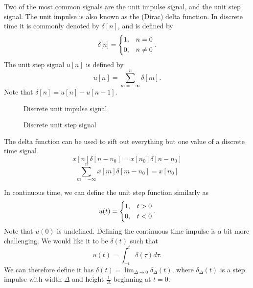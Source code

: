 \documentclass[12pt]{article}
\begin{document}
Two of the most common signals are the unit impulse signal, and the unit step signal. The unit impulse is also known as the (Dirac) delta function. In discrete time it is commonly denoted by $\delta[n]$, and is defined by
\[\delta[n] =
\begin{dcases}
    1, & n = 0 \\
    0, & n \neq 0
\end{dcases}.\] The unit step signal $u[n]$ is defined by
\[u[n] = \sum_{m=-\infty}^{n}\delta[m].\] Note that $\delta[n] = u[n] - u[n-1]$.

\begin{figure}[ht!]
    \centering
\caption{Discrete unit impulse signal}
\label{fig:discrete-unit-impulse}
\end{figure}

\begin{figure}[ht!]
    \centering
\caption{Discrete unit step signal}
\label{fig:discrete-unit-step}
\end{figure}

The delta function can be used to sift out everything but one value of a discrete time signal.
\[x[n]\delta[n-n_0] = x[n_0]\delta[n-n_0]\]
\[\sum_{m=-\infty}^n x[m]\delta[m-n_0] = x[n_0]\]

In continuous time, we can define the unit step function similarly as \[u(t) =
\begin{dcases}
    1, & t > 0 \\
    0, & t < 0
\end{dcases}.\]
Note that $u(0)$ is undefined. Defining the continuous time impulse is a bit more challenging. We would like it to be $\delta(t)$ such that
\[u(t) = \int_{-t}^{t}\delta(\tau)d\tau.\] We can therefore define it has $\delta(t) = \lim_{\Delta\to 0}\delta_{\Delta}(t)$, where $\delta_{\Delta}(t)$ is a step impulse with width $\Delta$ and height $\frac{1}{\Delta}$ beginning at $t = 0$.
\end{document}
